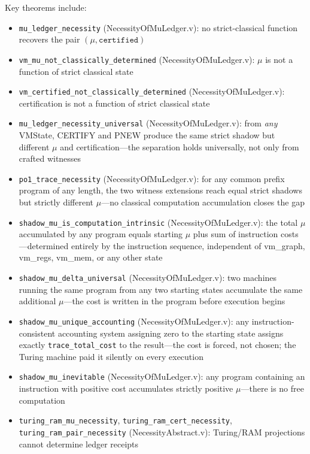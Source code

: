 Key theorems include:
\begin{itemize}
    \item \texttt{mu\_ledger\_necessity} (NecessityOfMuLedger.v): no strict-classical function recovers the pair $(\mu,\texttt{certified})$
    \item \texttt{vm\_mu\_not\_classically\_determined} (NecessityOfMuLedger.v): $\mu$ is not a function of strict classical state
    \item \texttt{vm\_certified\_not\_classically\_determined} (NecessityOfMuLedger.v): certification is not a function of strict classical state
    \item \texttt{mu\_ledger\_necessity\_universal} (NecessityOfMuLedger.v): from \emph{any} VMState, CERTIFY and PNEW produce the same strict shadow but different $\mu$ and certification---the separation holds universally, not only from crafted witnesses
    \item \texttt{po1\_trace\_necessity} (NecessityOfMuLedger.v): for any common prefix program of any length, the two witness extensions reach equal strict shadows but strictly different $\mu$---no classical computation accumulation closes the gap
    \item \texttt{shadow\_mu\_is\_computation\_intrinsic} (NecessityOfMuLedger.v): the total $\mu$ accumulated by any program equals starting $\mu$ plus sum of instruction costs---determined entirely by the instruction sequence, independent of vm\_graph, vm\_regs, vm\_mem, or any other state
    \item \texttt{shadow\_mu\_delta\_universal} (NecessityOfMuLedger.v): two machines running the same program from any two starting states accumulate the same additional $\mu$---the cost is written in the program before execution begins
    \item \texttt{shadow\_mu\_unique\_accounting} (NecessityOfMuLedger.v): any instruction-consistent accounting system assigning zero to the starting state assigns exactly \texttt{trace\_total\_cost} to the result---the cost is forced, not chosen; the Turing machine paid it silently on every execution
    \item \texttt{shadow\_mu\_inevitable} (NecessityOfMuLedger.v): any program containing an instruction with positive cost accumulates strictly positive $\mu$---there is no free computation
    \item \texttt{turing\_ram\_mu\_necessity}, \texttt{turing\_ram\_cert\_necessity}, \texttt{turing\_ram\_pair\_necessity} (NecessityAbstract.v): Turing/RAM projections cannot determine ledger receipts

\end{itemize}
